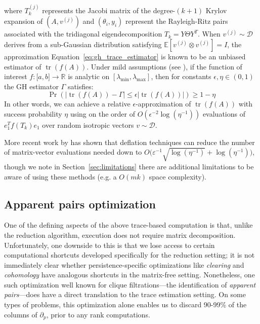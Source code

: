\documentclass[pdflatex,sn-mathphys-num]{sn-jnl}
\begin{document}
where \(T_{k}^{(j)}\) represents the Jacobi matrix of the degree-\((k + 1)\) Krylov expansion of \(\left. \left( A,v^{(j)} \right) \right.\) and \(\left( \theta_{i},y_{i} \right)\) represent the Rayleigh-Ritz pairs associated with the tridiagonal eigendecomposition \(T_{k} = Y\Theta Y^{T}\). When \(v^{(j)} \sim \mathcal{D}\) derives from a sub-Gaussian distribution satisfying \(\mathbb{E}\left. \left\lbrack v^{(j)} \otimes v^{(j)} \right\rbrack \right. = I\), the approximation Equation~\ref{eq:gh_trace_estimator} is known to be an unbiased estimator of \(\operatorname{tr}\left( f(A) \right)\). Under mild assumptions (see \cite{ubaru2016fast}), if the function of interest \(f:\left. \lbrack a,b\rbrack \right. \rightarrow \mathbb{R}\) is analytic on \(\left. \left\lbrack \lambda_{\min},\lambda_{\max} \right\rbrack \right.\), then for constants \(\epsilon,\eta \in (0,1)\) the GH estimator \(\Gamma\) satisfies:
\[
\Pr(\left| {\operatorname{tr}\left( f(A) \right) - \Gamma} \right| \leq \epsilon\left| {\operatorname{tr}\left( f(A) \right)} \right|) \geq 1 - \eta
\]
In other words, we can achieve a relative \(\epsilon\)-approximation of \(\operatorname{tr}\left( f(A) \right)\) with success probability \(\eta\) using on the order of \(O\left. \left( \epsilon^{- 2}\log\left. \left( \eta^{- 1} \right) \right. \right) \right.\) evaluations of \(e_{1}^{T}f\left( T_{k} \right)e_{1}\) over random isotropic vectors \(v \sim \mathcal{D}\).

More recent work by \cite{meyer2021hutchpp} has shown that deflation techniques can reduce the number of matrix-vector evaluations needed down to \(O\big( \varepsilon^{- 1}  \sqrt{\log( \eta^{- 1} )} + \log( \eta^{- 1} ) \big)\), though we note in Section~\ref{sec:limitations} there are additional limitations to be aware of using these methods (e.g. a \(O(mk)\) space complexity).

\subsection{Apparent pairs optimization}\label{sec:apparent-pairs-optimization}
One of the defining aspects of the above trace-based computation is that, unlike the reduction algorithm, execution does not require matrix decomposition. Unfortunately, one downside to this is that we lose access to certain computational shortcuts developed specifically for the reduction setting; it is not immediately clear whether persistence-specific optimizations like \emph{clearing} and \emph{cohomology} \cite{dey2022computational} have analogous shortcuts in the matrix-free setting. Nonetheless, one such optimization well known for clique filtrations---the identification of \emph{apparent pairs}---does have a direct translation to the trace estimation setting. On some types of problems, this optimization alone enables us to discard 90-99\% of the columns of \(\partial_{p}\), prior to any rank computations.
\end{document}
